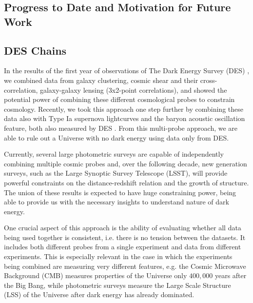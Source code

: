 \documentclass[12pt]{article}
\begin{document}
\begin{small}
\section{Progress to Date and Motivation for Future Work}




\subsection{DES Chains}

In the results of the first year of observations of The Dark Energy Survey (DES) \cite{desy1}, we combined data from galaxy clustering, cosmic shear and their cross-correlation, galaxy-galaxy lensing (3x2-point correlations), and showed the potential power of combining these different cosmological probes to constrain cosmology. Recently, we took this approach one step further by combining these data also with Type Ia supernova lightcurves and the baryon acoustic oscillation feature, both also measured by DES \cite{multiprobe}. From this multi-probe approach, we are able to rule out a Universe with no dark energy using data only from DES\cite{multiprobe}. 

Currently, several large photometric surveys are capable of independently combining multiple cosmic probes and, over the following decade, new generation surveys, such as the  Large  Synoptic  Survey  Telescope (LSST), will provide powerful constraints on the distance-redshift relation and the growth of structure. The union of these results is expected to have huge constraining power, being able to provide us with the necessary insights to understand nature of dark energy.

One crucial aspect of this approach is the ability of evaluating whether all data being used together is consistent, i.e. there is no tension between the datasets. It includes both different probes from a single experiment and data from different experiments. This is especially relevant in the case in which the experiments being combined are measuring very different features, e.g. the Cosmic Microwave Background (CMB) measures properties of the Universe only  $400,000$  years after the  Big  Bang, while photometric surveys measure the Large Scale Structure (LSS) of the Universe after dark energy has already dominated.


\end{small}
\end{document}
